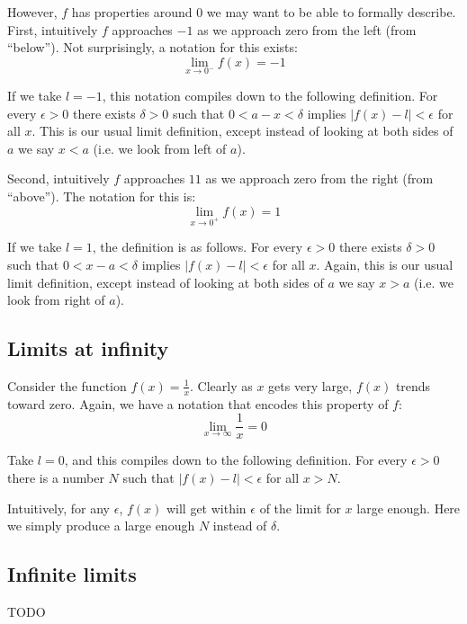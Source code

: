 However, $f$ has properties around $0$ we may want to be able to
formally describe. First, intuitively $f$ approaches $-1$ as we
approach zero from the left (from ``below''). Not surprisingly, a
notation for this exists:
\[\lim_{x\to0^-}f(x)=-1\]

If we take $l=-1$, this notation compiles down to the following
definition. For every $\epsilon>0$ there exists $\delta>0$ such that
$0<a-x<\delta$ implies $|f(x)-l|<\epsilon$ for all $x$. This is our usual limit
definition, except instead of looking at both sides of $a$ we say
$x<a$ (i.e. we look from left of $a$).

\vs

Second, intuitively $f$ approaches $11$ as we approach zero from the
right (from ``above''). The notation for this is:
\[\lim_{x\to0^+}f(x)=1\]

If we take $l=1$, the definition is as follows. For every $\epsilon>0$ there
exists $\delta>0$ such that $0<x-a<\delta$ implies $|f(x)-l|<\epsilon$ for all
$x$. Again, this is our usual limit definition, except instead of
looking at both sides of $a$ we say $x>a$ (i.e. we look from right of
$a$).

\subsection{Limits at infinity}
Consider the function $f(x)=\frac{1}{x}$. Clearly as $x$ gets very
large, $f(x)$ trends toward zero. Again, we have a notation that
encodes this property of $f$:
\[\lim_{x\to\infty}\frac{1}{x}=0\]

Take $l=0$, and this compiles down to the following definition. For
every $\epsilon>0$ there is a number $N$ such that $|f(x)-l|<\epsilon$ for all
$x>N$.

\vs

Intuitively, for any $\epsilon$, $f(x)$ will get within $\epsilon$ of the limit for
$x$ large enough. Here we simply produce a large enough $N$ instead of
$\delta$.

\subsection{Infinite limits}
TODO


